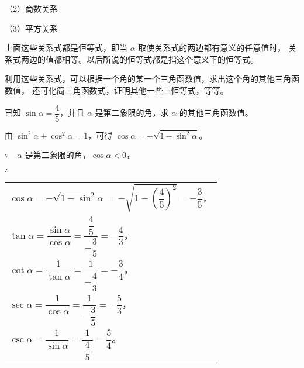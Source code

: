 （2）商数关系

\begin{center}
\end{center}

（3）平方关系

\begin{center}
\end{center}

上面这些关系式都是恒等式，即当 $\alpha$ 取使关系式的两边都有意义的任意值时，
关系式两边的值都相等。以后所说的恒等式都是指这个意义下的恒等式。

利用这些关系式，可以根据一个角的某一个三角函数值，求出这个角的其他三角函数值，
还可化简三角函数式，证明其他一些三恒等式，等等。

\liti 已知 $\sin \alpha = \dfrac 4 5$，并且 $\alpha$ 是第二象限的角，求 $\alpha$ 的其他三角函数值。
\vspace{0.5em}

\jie 由 $\sin^2 \alpha + \cos^2 \alpha = 1$，可得 $\cos \alpha = \pm \sqrt{1 - \sin^2 \alpha}$。

$\because \quad \alpha$ 是第二象限的角，$\cos \alpha < 0$，

$\therefore$
\begin{tabular}[t]{l}
    \rule{0pt}{3em}$\cos \alpha = - \sqrt{1 - \sin^2 \alpha} = - \sqrt{1 - \left( \dfrac 4 5 \right)^2} = -\dfrac 3 5$，\\
    \rule{0pt}{2em}$\tan \alpha = \dfrac{\sin \alpha}{\cos \alpha} = \dfrac{\dfrac 4 5}{-\dfrac 3 5} = -\dfrac 4 3$，\\
    \rule{0pt}{2em}$\cot \alpha = \dfrac{1}{\tan \alpha} = \dfrac{1}{-\dfrac 4 3} = -\dfrac 3 4$，\\
    \rule{0pt}{2em}$\sec \alpha = \dfrac{1}{\cos \alpha} = \dfrac{1}{-\dfrac 3 5} = -\dfrac 5 3$，\\
    \rule{0pt}{2em}$\csc \alpha = \dfrac{1}{\sin \alpha} = \dfrac{1}{\; \dfrac 4 5 \;} = \dfrac 5 4$。
\end{tabular}

